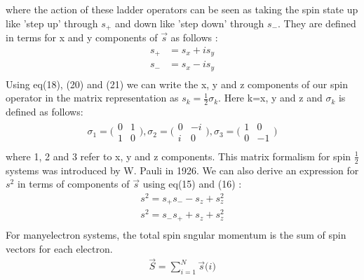 \documentclass[11pt]{article}   	%
\begin{document}
	where the action of these ladder operators can be seen as taking the spin state up 
	like 'step up' through $s_+$ and down like 'step down' through $s_-$. They are 
	defined in terms for x and y components of $\vec{s}$ as follows :
	\begin{equation}
	\begin{split}
		s_+&=s_x+is_y\\
		s_-&=s_x-is_y\\
	\end{split}
	\end{equation}
	Using eq(18), (20) and (21) we can write the x, y and z components of our spin operator in the matrix 
	representation as $s_k=\frac{1}{2} \sigma_k$. Here k=x, y and z and $\sigma_k$ is defined as follows:\\
	\begin{equation}
		\begin{split}
		\sigma_1=\bigg(\begin{matrix}0 & 1\\ 1 & 0\end{matrix}\bigg),
		\sigma_2=\bigg(\begin{matrix}0 & -i\\ i & 0\end{matrix}\bigg), 
		\sigma_3=\bigg(\begin{matrix}1 & 0\\ 0 & -1\end{matrix}\bigg)\\ 
		\end{split}
	\end{equation}
	where 1, 2 and 3 refer to x, y and z components. This matrix formalism for spin $\frac{1}{2}$ systems 
	was introduced by W. Pauli in 1926. We can also derive an expression for $s^2$ in terms of components
	of $\vec{s}$ using eq(15) and (16) :\\
	\begin{equation}
	\begin{split}
		s^2=s_+s_--s_z+s_z^2\\
		s^2=s_-s_++s_z+s_z^2\\
	\end{split}
	\end{equation}
	For manyelectron systems, the total spin sngular momentum is the sum of spin vectors for each 
	electron.\\
	\begin{equation}
	\begin{split}
		\vec{S}=\sum_{i=1}^N \vec{s}\big(i\big)\\
	\end{split}
	\end{equation}	
\end{document}
